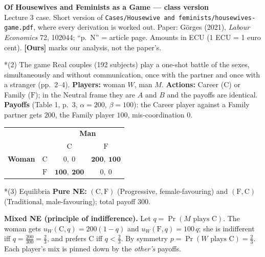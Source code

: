 \documentclass[10pt,a4paper]{article}
\makeatletter
\renewcommand\section{\@startsection{section}{1}{\z@}{6pt plus 2pt}{2pt}{\normalfont\large\bfseries}}
\newcommand{\ours}{\textcolor{warn}{\textbf{[Ours]}}}
\newcommand{\C}{\mathrm{C}}
\newcommand{\Fm}{\mathrm{F}}
\makeatother
\begin{document}
\begin{center}
{\Large\bfseries Of Housewives and Feminists as a Game --- class version}\\[2pt]
{\small Lecture 3 case. Short version of \texttt{Cases/Housewive and feminists/housewives-game.pdf},
where every derivation is worked out. Paper: G\"orges (2021), \emph{Labour Economics} 72, 102044;
``p.~N'' = article page. Amounts in ECU (1 ECU = 1 euro cent). \ours{} marks our analysis, not the paper's.}
\end{center}

\section*{(2) The game}
Real couples (192 subjects) play a one-shot battle of the sexes, simultaneously and without
communication, once with the partner and once with a stranger (pp.~2--4). \textbf{Players:} woman
$W$, man $M$. \textbf{Actions:} Career ($\C$) or Family ($\Fm$); in the Neutral frame they are $A$ and
$B$ and the payoffs are identical. \textbf{Payoffs} (Table 1, p.~3, $\alpha=200$, $\beta=100$): the
Career player against a Family partner gets $200$, the Family player $100$, mis-coordination $0$.

\begin{center}
\begin{tabular}{cc|cc}
 & & \multicolumn{2}{c}{\textbf{Man}}\\
 & & $\C$ & $\Fm$ \\ \hline
\textbf{Woman} & $\C$ & $0,\ 0$ & $\mathbf{200},\ \mathbf{100}$ \\
 & $\Fm$ & $\mathbf{100},\ \mathbf{200}$ & $0,\ 0$ \\
\end{tabular}
\end{center}

\section*{(3) Equilibria}
\textbf{Pure NE:} $(\C,\Fm)$ (Progressive, female-favouring) and $(\Fm,\C)$ (Traditional,
male-favouring); total payoff $300$.

\textbf{Mixed NE (principle of indifference).} Let $q=\Pr(M\text{ plays }\C)$. The woman gets
$u_W(\C,q)=200(1-q)$ and $u_W(\Fm,q)=100\,q$; she is indifferent iff $q=\tfrac{200}{300}=\tfrac23$, and
prefers $\C$ iff $q<\tfrac23$. By symmetry $p=\Pr(W\text{ plays }\C)=\tfrac23$. Each player's mix is
pinned down by the \emph{other's} payoffs.
\end{document}
